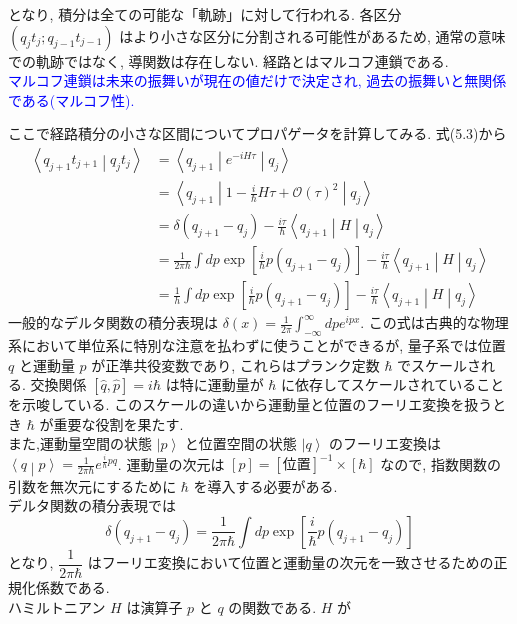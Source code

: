 \documentclass{jsarticle}
\newcommand{\ket}[1]{\left|#1\right\rangle}
\newcommand{\braket}[2]{\left\langle #1\middle|#2\right\rangle}
\newcommand{\brakets}[3]{\left\langle #1\middle| #2 \middle|#3 \right\rangle}
\begin{document}
となり, 積分は全ての可能な「軌跡」に対して行われる. 各区分 $(q_{j}t_{j}; q_{j-1}t_{j-1})$ はより小さな区分に分割される可能性があるため, 通常の意味での軌跡ではなく, 導関数は存在しない. 経路とはマルコフ連鎖である.\\
\textcolor{blue}{マルコフ連鎖は未来の振舞いが現在の値だけで決定され, 過去の振舞いと無関係である(マルコフ性).}\par
ここで経路積分の小さな区間についてプロパゲータを計算してみる. 式(5.3)から
\begin{align*}
    \braket{q_{j+1}t_{j+1}}{q_{j}t_{j}} &= \brakets{q_{j+1}}{e^{-iH\tau}}{q_{j}}\\
    &= \brakets{q_{j+1}}{1 - \frac{i}{\hbar}H\tau + \mathcal{O}(\tau)^{2}}{q_{j}}\\
    &= \delta(q_{j+1} - q_{j}) - \frac{i\tau}{\hbar}\brakets{q_{j+1}}{H}{q_{j}}\\
    &= \frac{1}{2\pi\hbar}\int dp \exp\left[ \frac{i}{\hbar}p(q_{j+1} - q_{j}) \right] - \frac{i\tau}{\hbar}\brakets{q_{j+1}}{H}{q_{j}} \tag{5.7}\\
    &= \frac{1}{h}\int dp \exp\left[ \frac{i}{\hbar}p(q_{j+1} - q_{j}) \right] - \frac{i\tau}{\hbar}\brakets{q_{j+1}}{H}{q_{j}}
\end{align*}
\color{blue}
一般的なデルタ関数の積分表現は $\displaystyle \delta(x) = \frac{1}{2\pi}\int_{-\infty}^{\infty}dp e^{ipx}$. この式は古典的な物理系において単位系に特別な注意を払わずに使うことができるが, 量子系では位置 $q$ と運動量 $p$ が正準共役変数であり, これらはプランク定数 $\hbar$ でスケールされる. 交換関係 $[\hat{q}, \hat{p}] = i\hbar$ は特に運動量が $\hbar$ に依存してスケールされていることを示唆している. このスケールの違いから運動量と位置のフーリエ変換を扱うとき $\hbar$ が重要な役割を果たす.\\
また,運動量空間の状態 $\ket{p}$ と位置空間の状態 $\ket{q}$ のフーリエ変換は $\displaystyle \braket{q}{p} = \frac{1}{2\pi\hbar}e^{\frac{i}{\hbar}pq}$. 運動量の次元は $[p] = [\textrm{位置}]^{-1} \times [\hbar]$ なので, 指数関数の引数を無次元にするために $\hbar$ を導入する必要がある.\\
デルタ関数の積分表現では
\begin{equation*}
    \delta(q_{j+1} - q_{j}) = \frac{1}{2\pi\hbar}\int dp \exp\left[ \frac{i}{\hbar}p(q_{j+1} - q_{j}) \right]
\end{equation*}
となり, $\dfrac{1}{2\pi\hbar}$ はフーリエ変換において位置と運動量の次元を一致させるための正規化係数である. \\
\color{black}
ハミルトニアン $H$ は演算子 $p$ と $q$ の関数である. $H$ が
\end{document}
